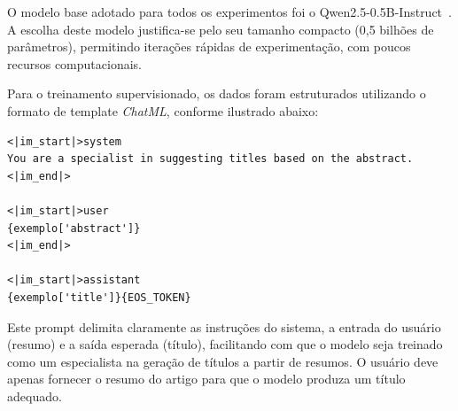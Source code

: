 O modelo base adotado para todos os experimentos foi o Qwen2.5-0.5B-Instruct~\cite{yang_qwen2_2024,team_qwen25_2024}.
A escolha deste modelo justifica-se pelo seu tamanho compacto (0,5 bilhões de parâmetros), permitindo iterações rápidas de experimentação, com poucos recursos computacionais.

Para o treinamento supervisionado, os dados foram estruturados utilizando o formato de template \textit{ChatML}, conforme ilustrado abaixo:

\begin{verbatim}
<|im_start|>system
You are a specialist in suggesting titles based on the abstract.
<|im_end|>

<|im_start|>user
{exemplo['abstract']}
<|im_end|>

<|im_start|>assistant
{exemplo['title']}{EOS_TOKEN}
\end{verbatim}

Este prompt delimita claramente as instruções do sistema, a entrada do usuário (resumo) e a saída esperada (título), facilitando com que o modelo seja treinado como um especialista na geração de títulos a partir de resumos. O usuário deve apenas fornecer o resumo do artigo para que o modelo produza um título adequado.







